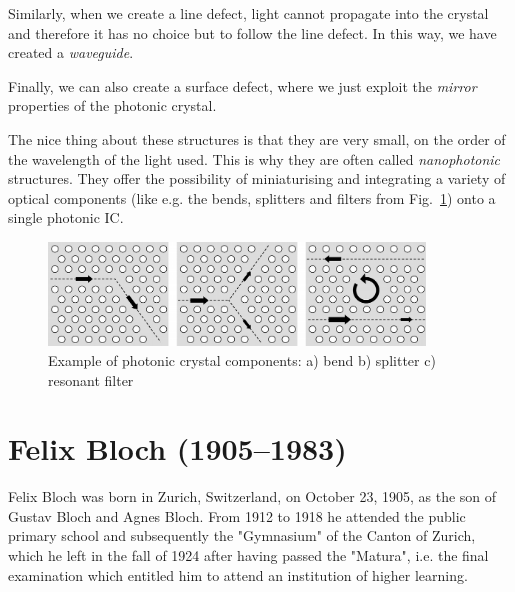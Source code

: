 Similarly, when we create a line defect, light cannot propagate into the crystal and therefore it has no choice but to follow the line defect. In this way, we have created a \emph{waveguide}.

Finally, we can also create a surface defect, where we just exploit the \emph{mirror} properties  of the photonic crystal.

The nice thing about these structures is that they are very small, on the order of the wavelength of the light used. This is why they are often called \emph{nanophotonic} structures. They offer the possibility of miniaturising and integrating a variety of optical components (like e.g. the bends, splitters and filters from Fig.~\ref{fig-components}) onto a single photonic IC.

\begin{figure}
\centering
\includegraphics[width=10cm]{periodic/figures/2d_components}
\caption{Example of photonic crystal components: a) bend b) splitter c) resonant filter}
\label{fig-components}
\end{figure}

\pagebreak
\section*{Felix Bloch (1905--1983)}


Felix Bloch was born in Zurich, Switzerland, on October 23, 1905, as the son of Gustav Bloch and Agnes Bloch. From 1912 to 1918 he attended the public primary school and subsequently the "Gymnasium" of the Canton of Zurich, which he left in the fall of 1924 after having passed the "Matura", i.e. the final examination which entitled him to attend an institution of higher learning.
 
